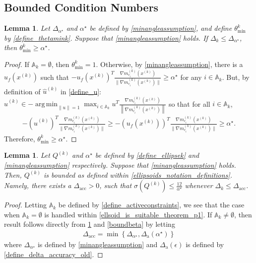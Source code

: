 \documentclass{article}
\newtheorem{lemma}[theorem]{Lemma}
\theoremstyle{case}
\numberwithin{theorem}{subsection}
\DeclareMathOperator*{\argmin}{arg\,min}
\newcommand{\activeconstraintsk}{{\mathbb A_{k}}}
\newcommand{\dacc}{{\Delta_{\textrm{acc}}}}
\newcommand{\dacco}{{\Delta_{\textrm{a}}}}
\newcommand{\dk}{\Delta_k}
\newcommand{\gmcik}{{\nabla m_{c_i}^{(k)}\left(\xk\right)}}
\newcommand{\huk}{{{\hat u}^{(k)}}}
\newcommand{\minanglealpha}{{ \alpha^{\star} }}
\newcommand{\minangledelta}{{\Delta_{\alpha^{\star}}}}
\newcommand{\qk}{{Q^{(k)}}}
\newcommand{\thetamink}{{\theta^k_{\textrm{min}}}}
\newcommand{\xk}{{x^{(k)}}}
\newcommand{\minangledir}{{u_f}}
\begin{document}
\subsection{Bounded Condition Numbers}


\begin{lemma}
\label{theta_min_is_bounded}
Let $\minangledelta$ and $\minanglealpha$ be defined by \cref{minangleassumption}, and
define $\thetamink$ by \cref{define_thetamink}.
Suppose that \cref{minangleassumption} holds.
If $\dk \le \minangledelta$, then $\thetamink \ge \minanglealpha$.
\end{lemma}

\begin{proof}
If $\activeconstraintsk = \emptyset$, then $\thetamink = 1$.
Otherwise, by \cref{minangleassumption}, there is a $\minangledir(\xk)$ such that 
$-\minangledir(\xk)^T\frac{\gmcik}{\|\gmcik\|} \ge \minanglealpha$ for any $i \in \activeconstraintsk$.
But, by definition of $\huk$ in \cref{define_u}:
$\huk \in -\argmin_{\|u\| = 1} \max_{i \in \activeconstraintsk} u^T\frac{\gmcik}{\left\|\gmcik\right\|}$
so that for all $i \in \activeconstraintsk$,
\begin{align*}
-\left(\huk\right)^T\frac{\gmcik}{\|\gmcik\|}  \ge -\left(\minangledir(\xk)\right)^T\frac{\gmcik}{\|\gmcik\|} \ge \minanglealpha.
\end{align*}
Therefore, $\thetamink \ge \minanglealpha$.
\end{proof}

\begin{lemma}
\label{bounded_condition_numbers}
Let $\qk$ and $\minanglealpha$ be defined by \cref{define_ellipsek} and \cref{minangleassumption} respectively.
Suppose that \cref{minangleassumption} holds.
Then, $\qk$ is bounded as defined within \cref{ellipsoids_notation_definitions}.
Namely, there exists a $\dacc > 0$, such that $\sigma(\qk) \le \frac {12}{\minanglealpha}$ whenever $\dk \le \dacc$.
\end{lemma}
\begin{proof}
Letting $\activeconstraintsk$ be defined by \cref{define_activeconstraints}, we see that the case when $\activeconstraintsk = \emptyset$ is handled within \cref{ellsoid_is_suitable_theorem_p1}.
If $\activeconstraintsk \ne \emptyset$, then result follows directly from \cref{theta_min_is_bounded} and \cref{boundbeta} by letting
\begin{align}
\dacc = \min\left\{\minangledelta, \dacco(\minanglealpha) \right\} \label{define_delta_accuracy}
\end{align}
where $\minangledelta$ is defined by \cref{minangleassumption} and $\dacco(\epsilon)$ is defined by \cref{define_delta_accuracy_old}.
\end{proof}
\end{document}
